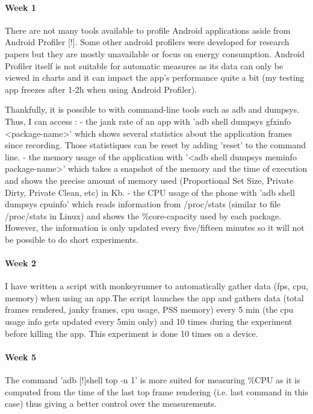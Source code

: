 \documentclass{kththesis}
\newcommand{\citationneeded}{\todo{Citation needed}[!]}
\begin{document}
\paragraph{Week 1}
 There are not many tools available to profile Android applications aside from Android Profiler \citationneeded. Some other android profilers were developed for research papers but they are mostly unavailable or focus on energy consumption. Android Profiler itself is not suitable for automatic measures as its data can only be viewed in charts and it can impact the app's performance quite a bit (my testing app freezes after 1-2h when using Android Profiler).

    Thankfully, it is possible to with command-line tools such as adb and dumpsys. Thus, I can access : 
            - the jank rate of an app with 'adb shell dumpsys gfxinfo <package-name>' which shows several statistics about the application frames since recording. Those statistiques can be reset by adding 'reset' to the command line. 
            - the memory usage of the application with '<adb shell dumpsys meminfo package-name>' which takes a snapshot of the memory and the time of execution and shows the precise amount of memory used (Proportional Set Size, Private Dirty, Private Clean, etc) in Kb. 
            - the CPU usage of the phone with 'adb shell dumpsys cpuinfo' which reads information from /proc/stats (similar to file /proc/stats in Linux) and shows the \%core-capacity used by each package. However, the information is only updated every five/fifteen minutes so it will not be possible to do short experiments.
\paragraph{Week 2}

I have written a script with monkeyrunner to automatically gather data (fps, cpu, memory) when using an app.The script launches the app and gathers data (total frames rendered, janky frames, cpu usage, PSS memory) every 5 min (the cpu usage info gets updated every 5min only) and 10 times during the experiment before killing the app. This experiment is done 10 times on a device.

\paragraph{Week 5}
The command 'adb  \citationneeded shell top -n 1' is more suited for measuring \%CPU as it is computed from the time of the last top frame rendering (i.e. last command in this case) thus giving a better control over the measurements.
\end{document}
